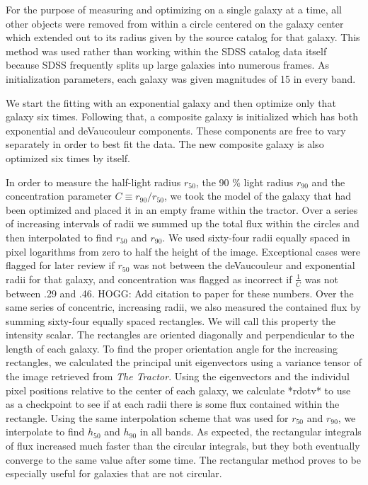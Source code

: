 \documentclass[12pt,preprint,pdftex]{aastex}
\newcommand{\rfifty}{r_{50}}
\newcommand{\rninety}{r_{90}}
\newcommand{\hfifty}{h_{50}}
\newcommand{\hninety}{h_{90}}
\newcommand{\conc}{C}
\begin{document}
For the purpose of measuring and optimizing on a single galaxy at a
time, all other objects were removed from within a circle centered on
the galaxy center which extended out to its radius given by the source
catalog for that galaxy. This method was used rather than working within the
SDSS catalog data itself because SDSS frequently splits up large galaxies into
numerous frames. As initialization parameters, each galaxy was
given magnitudes of 15 in every band.

We start the fitting with an exponential galaxy and then optimize only
that galaxy six times. Following that, a composite galaxy is
initialized which has both exponential and deVaucouleur
components. These components are free to vary separately in order to
best fit the data. The new composite galaxy is also optimized six
times by itself.

In order to measure the half-light radius $\rfifty$, the 90 \% light
radius $\rninety$ and the concentration parameter $\conc\equiv
\rninety/\rfifty$, we took the model of the galaxy that had been
optimized and placed it in an empty frame within the tractor.  Over a
series of increasing intervals of radii we summed up the total flux
within the circles and then interpolated to find $\rfifty$ and
$\rninety$.  We used sixty-four radii equally spaced in pixel
logarithms from zero to half the height of the image. Exceptional
cases were flagged for later review if $\rfifty$ was not between the
deVaucouleur and exponential radii for that galaxy, and concentration
was flagged as incorrect if $\frac{1}{\conc}$ was not between .29 and
.46.  HOGG: Add citation to paper for these numbers. Over the same
series of concentric, increasing radii, we also measured the contained
flux by summing sixty-four equally spaced rectangles. We will call
this property the intensity scalar. The rectangles are oriented
diagonally and perpendicular to the length of each galaxy. To find the
proper orientation angle for the increasing rectangles, we calculated
the principal unit eigenvectors using a variance tensor of the image
retrieved from \emph{The Tractor}. Using the eigenvectors and the
individul pixel positions relative to the center of each galaxy, we
calculate *rdotv* to use as a checkpoint to see if at each radii there
is some flux contained within the rectangle. Using the same
interpolation scheme that was used for $\rfifty$ and $\rninety$, we
interpolate to find $\hfifty$ and $\hninety$ in all bands. As
expected, the rectangular integrals of flux increased much faster than
the circular integrals, but they both eventually converge to the same
value after some time. The rectangular method proves to be especially
useful for galaxies that are not circular.
\end{document}

